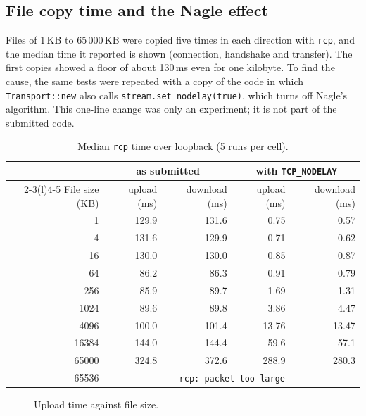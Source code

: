 \documentclass[11pt,a4paper]{article}
\begin{document}
\subsection{File copy time and the Nagle effect}
\label{sec:nagle}

Files of 1\,KB to 65\,000\,KB were copied five times in each direction with
\texttt{rcp}, and the median time it reported is shown (connection, handshake
and transfer). The first copies showed a floor of about 130\,ms even for one
kilobyte. To find the cause, the same tests were repeated with a copy of the
code in which \texttt{Transport::new} also calls
\texttt{stream.set\_nodelay(true)}, which turns off Nagle's algorithm. This
one-line change was only an experiment; it is not part of the submitted code.

\begin{table}[H]
\centering
\small
\begin{tabular}{@{}r r r r r@{}}
\toprule
& \multicolumn{2}{c}{as submitted} & \multicolumn{2}{c}{with \texttt{TCP\_NODELAY}} \\
\cmidrule(lr){2-3}\cmidrule(l){4-5}
File size (KB) & upload (ms) & download (ms) & upload (ms) & download (ms) \\
\midrule
1      & 129.9 & 131.6 & 0.75  & 0.57  \\
4      & 131.6 & 129.9 & 0.71  & 0.62  \\
16     & 130.0 & 130.0 & 0.85  & 0.87  \\
64     & 86.2  & 86.3  & 0.91  & 0.79  \\
256    & 85.9  & 89.7  & 1.69  & 1.31  \\
1024   & 89.6  & 89.8  & 3.86  & 4.47  \\
4096   & 100.0 & 101.4 & 13.76 & 13.47 \\
16384  & 144.0 & 144.4 & 59.6  & 57.1  \\
65000  & 324.8 & 372.6 & 288.9 & 280.3 \\
65536  & \multicolumn{4}{c}{\texttt{rcp: packet too large}} \\
\bottomrule
\end{tabular}
\caption{Median \texttt{rcp} time over loopback (5 runs per cell).}
\label{tab:rcp}
\end{table}

\begin{figure}[H]
\centering
{}
\caption{Upload time against file size.}
\label{fig:rcp}
\end{figure}
\end{document}
